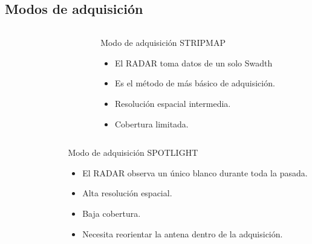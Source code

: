 \subsection{Modos de adquisición}

\begin{frame}{} \vskip0cm
  \begin{columns}
    \begin{column}{0.5\textwidth}
       \begin{figure}
         \centering
         \label{}
       \end{figure}
    \end{column}
    \begin{column}{0.5\textwidth}  %
      \begin{block}{Modo de adquisición STRIPMAP}
        \begin{itemize}
          \item El RADAR toma datos de un solo Swadth
          \item Es el método de más básico de adquisición.
          \item Resolución espacial intermedia.
          \item Cobertura limitada.
        \end{itemize}
      \end{block}
    \end{column}
    \end{columns}
\end{frame}

\begin{frame}{} \vskip0cm
  \begin{columns}
    \begin{column}{0.5\textwidth}
       \begin{figure}
         \centering
         \label{}
       \end{figure}
    \end{column}
    \begin{column}{0.5\textwidth}  %
      \begin{block}{Modo de adquisición SPOTLIGHT}
        \begin{itemize}
          \item El RADAR observa un único blanco durante toda la pasada.
          \item Alta resolución espacial.
          \item Baja cobertura.
          \item Necesita reorientar la antena dentro de la adquisición.
        \end{itemize}
      \end{block}
    \end{column}
    \end{columns}
\end{frame}

